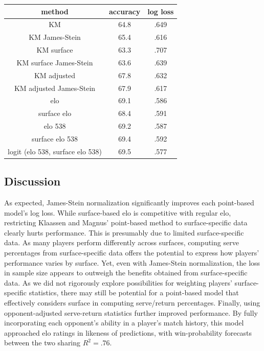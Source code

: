 \documentclass[chapterprefix=false]{report}
\begin{document}
\begin{center}
\begin{tabular}{ |c|c|c| } 
 \hline
 method & accuracy & log loss
   \\ 
 \hline
  KM & 64.8 & .649
  \\ 
 \hline
  KM James-Stein & 65.4 & .616
  \\ 
 \hline
 KM surface & 63.3 & .707
  \\ 
 \hline
 KM surface James-Stein & 63.6 & .639
  \\ 
 \hline
 KM adjusted & 67.8 & .632
  \\ 
 \hline
 KM adjusted James-Stein & 67.9 & .617
  \\ 
 \hline
  elo & 69.1 & .586
  \\ 
 \hline
 surface elo & 68.4 & .591
  \\ 
 \hline
 elo 538 & 69.2 & .587
  \\ 
 \hline
 surface elo 538 & 69.4 & .592
  \\ 
 \hline
 logit (elo 538, surface elo 538) & 69.5 & .577
  \\ 
 \hline
\end{tabular}
\end{center}

\subsection{Discussion}

As expected, James-Stein normalization significantly improves each point-based model's log loss. While surface-based elo is competitive with regular elo, restricting Klaassen and Magnus' point-based method to surface-specific data clearly hurts performance. This is presumably due to limited surface-specific data. As many players perform differently across surfaces, computing serve percentages from surface-specific data offers the potential to express how players' performance varies by surface. Yet, even with James-Stein normalization, the loss in sample size appears to outweigh the benefits obtained from surface-specific data. As we did not rigorously explore possibilities for weighting players' surface-specific statistics, there may still be potential for a point-based model that effectively considers surface in computing serve/return percentages. Finally, using opponent-adjusted serve-return statistics further improved performance. By fully incorporating each opponent's ability in a player's match history, this model approached elo ratings in likeness of predictions, with win-probability forecasts between the two sharing $R^2=.76$.
\end{document}
